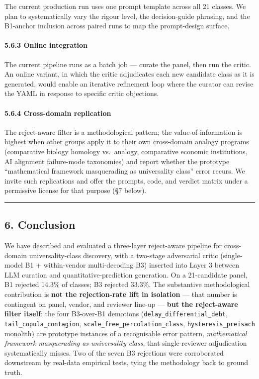 \documentclass[
  letterpaper,
  11pt]{article}
\begin{document}
The current production run uses one prompt template across all 21
classes. We plan to systematically vary the rigour level, the
decision-guide phrasing, and the B1-anchor inclusion across paired runs
to map the prompt-design surface.

\paragraph{5.6.3 Online integration}\label{online-integration}

The current pipeline runs as a batch job --- curate the panel, then run
the critic. An online variant, in which the critic adjudicates each new
candidate class as it is generated, would enable an iterative refinement
loop where the curator can revise the YAML in response to specific
critic objections.

\paragraph{5.6.4 Cross-domain
replication}\label{cross-domain-replication}

The reject-aware filter is a methodological pattern; the
value-of-information is highest when other groups apply it to their own
cross-domain analogy programs (comparative biology homology vs.~analogy,
comparative economic institutions, AI alignment failure-mode taxonomies)
and report whether the prototype ``mathematical framework masquerading
as universality class'' error recurs. We invite such replications and
offer the prompts, code, and verdict matrix under a permissive license
for that purpose (§7 below).

\begin{center}\rule{0.5\linewidth}{0.5pt}\end{center}

\subsection{6. Conclusion}\label{conclusion}

We have described and evaluated a three-layer reject-aware pipeline for
cross-domain universality-class discovery, with a two-stage adversarial
critic (single-model B1 + within-vendor multi-decoding B3) inserted into
Layer 3 between LLM curation and quantitative-prediction generation. On
a 21-candidate panel, B1 rejected 14.3\% of classes; B3 rejected 33.3\%.
The substantive methodological contribution is \textbf{not the
rejection-rate lift in isolation} --- that number is contingent on
panel, vendor, and reviewer line-up --- \textbf{but the reject-aware
filter itself}: the four B3-over-B1 demotions
(\texttt{delay\_differential\_debt}, \texttt{tail\_copula\_contagion},
\texttt{scale\_free\_percolation\_class}, \texttt{hysteresis\_preisach}
monolith) are prototype instances of a recognisable error pattern,
\emph{mathematical framework masquerading as universality class}, that
single-reviewer adjudication systematically misses. Two of the seven B3
rejections were corroborated downstream by real-data empirical tests,
tying the methodology back to ground truth.
\end{document}
